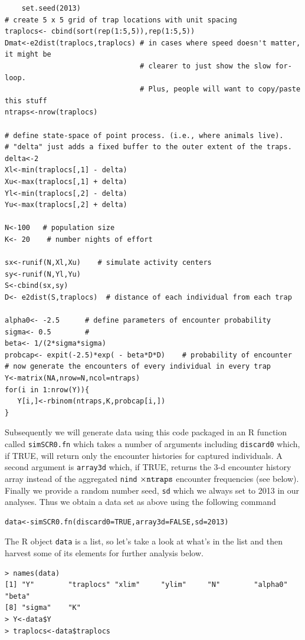 \begin{verbatim}
	set.seed(2013)
# create 5 x 5 grid of trap locations with unit spacing
traplocs<- cbind(sort(rep(1:5,5)),rep(1:5,5))
Dmat<-e2dist(traplocs,traplocs) # in cases where speed doesn't matter, it might be  
                                # clearer to just show the slow for-loop. 
                                # Plus, people will want to copy/paste this stuff
ntraps<-nrow(traplocs)

# define state-space of point process. (i.e., where animals live).
# "delta" just adds a fixed buffer to the outer extent of the traps. 
delta<-2
Xl<-min(traplocs[,1] - delta)
Xu<-max(traplocs[,1] + delta)
Yl<-min(traplocs[,2] - delta)
Yu<-max(traplocs[,2] + delta)

N<-100   # population size
K<- 20    # number nights of effort

sx<-runif(N,Xl,Xu)    # simulate activity centers
sy<-runif(N,Yl,Yu)
S<-cbind(sx,sy) 
D<- e2dist(S,traplocs)  # distance of each individual from each trap

alpha0<- -2.5      # define parameters of encounter probability
sigma<- 0.5        #
beta<- 1/(2*sigma*sigma)
probcap<- expit(-2.5)*exp( - beta*D*D)    # probability of encounter
# now generate the encounters of every individual in every trap
Y<-matrix(NA,nrow=N,ncol=ntraps)
for(i in 1:nrow(Y)){
   Y[i,]<-rbinom(ntraps,K,probcap[i,])
}
\end{verbatim}


Subsequently we will generate data using this code packaged in an R function called \mbox{\tt simSCR0.fn} which takes a number of arguments including \mbox{\tt discard0} which, if TRUE, will return only the encounter histories for captured individuals.  A second argument is \mbox{\tt array3d} which, if TRUE, returns the 3-d encounter history array instead of the aggregated \mbox{\tt nind} $\times \mbox{\tt ntraps}$ encounter frequencies (see below). Finally we provide a random number seed, \mbox{\tt sd} which we always set to 2013 in our analyses.  Thus we obtain a data set as above using the following command
\begin{verbatim}
data<-simSCR0.fn(discard0=TRUE,array3d=FALSE,sd=2013)
\end{verbatim}
The R object \mbox{\tt data} is a list, so let's take a look at what's in the list and then harvest some of its elements for further analysis below.
\begin{verbatim}
> names(data)
[1] "Y"        "traplocs" "xlim"     "ylim"     "N"        "alpha0"   "beta"  
[8] "sigma"    "K"       
> Y<-data$Y
> traplocs<-data$traplocs
\end{verbatim}


